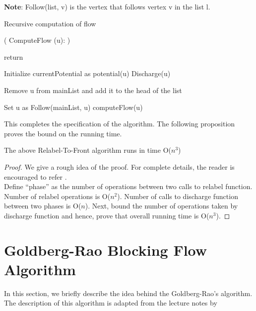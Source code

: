 \documentclass[BTech]{iitmdiss}
\begin{document}
	      \textbf{Note}: Follow(list, v) is the vertex that follows vertex v in the list l. \\
	      
	      \begin{algorithm}
	       \caption{Recursive computation of flow}
	       \Begin( ComputeFlow {(u)}: )
	       {
		  {
		      return \;
		  }
		  
		  Initialize currentPotential as potential(u) \;
		  Discharge(u) \;
		  {
		      Remove u from mainList and add it to the head of the list \;
		  
		  }
		  
		  Set u as Follow(mainList, u) \;
		  computeFlow(u) \;
	       
	       }
	       
	      \end{algorithm}
	      
	      This completes the specification of the algorithm. The following proposition proves the bound on the running time.
	      
	      \begin{prop}
	       The above Relabel-To-Front algorithm runs in time O($n^3$)
	      \end{prop}
	      
	      \begin{proof}
		We give a rough idea of the proof. For complete details, the reader is encouraged to refer \cite{clrs}.\\
		
		Define ``phase'' as the number of operations between two calls to relabel function. Number of relabel operations is O($n^2$). 
		Number of calls to discharge function between two phases is O($	n$). Next, bound the number of operations taken by discharge function
		and hence, prove that overall running time is O($n^3$).
	       
	      \end{proof}


	    
	   \section{Goldberg-Rao Blocking Flow Algorithm}
	    In this section, we briefly describe the idea behind the Goldberg-Rao's algorithm. The description of this algorithm is adapted from 
	    the lecture notes by \cite{williamson} \\
	    
\end{document}
